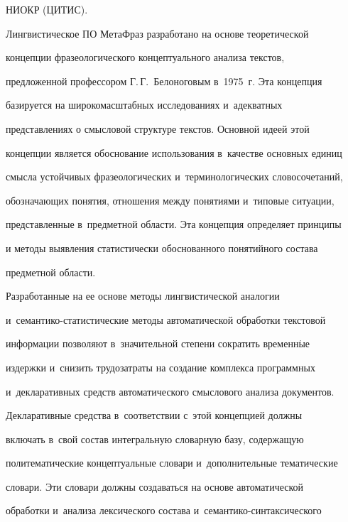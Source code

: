 НИОКР (ЦИТИС).


     


     Лингвистическое ПО МетаФраз разработано на основе теоретической 


концепции фразеологического концептуального анализа текстов, 


предложенной профессором Г.\,Г.~Белоноговым в~1975~г. Эта концепция 


базируется на широкомасштабных исследованиях и~адекватных 


представлениях о смысловой структуре текстов. Основной идеей этой 


концепции является обоснование использования в~качестве основных единиц 


смысла устойчивых фразеологических и~терминологических словосочетаний, 


обозначающих понятия, отношения между понятиями и~типовые ситуации, 


представленные в~предметной области. Эта концепция определяет принципы 


и методы выявления статистически обоснованного понятийного состава 


предметной области.


     


     Разработанные на ее основе методы лингвистической аналогии 


и~семан\-ти\-ко-ста\-ти\-сти\-че\-ские методы автоматической обработки текстовой 


информации поз\-воляют в~значительной степени сократить временн$\acute{\mbox{ы}}$е 


издержки и~снизить тру\-до\-затраты на создание комплекса программных 


и~декларативных средств автоматического смыслового анализа документов.


     


     Декларативные средства в~соответствии с~этой концепцией должны 


включать в~свой состав интегральную словарную базу, содержащую 


политематические концептуальные словари и~дополнительные тематические 


словари. Эти словари должны создаваться на основе автоматической 


обработки и~анализа лексического состава и~се\-ман\-ти\-ко-син\-так\-си\-че\-ско\-го 


